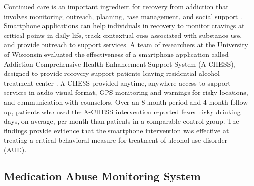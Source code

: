 \documentclass[sigconf]{acmart}
\begin{document}
Continued care is an important ingredient for recovery from addiction that
involves monitoring, outreach, planning, case management, and social support 
\cite{johnson11}. Smartphone applications can help individuals in recovery to 
monitor cravings at critical points in daily life, track contextual cues 
associated with substance use, and provide outreach to support services. A team 
of researchers at the University of Wisconsin evaluated the effectiveness of a
smartphone application called Addiction Comprehensive Health Enhancement Support 
System (A-CHESS), designed to provide recovery support patients leaving 
residential alcohol treatment center \cite{gustafson14}. A-CHESS provided anytime, 
anywhere access to support services in audio-visual format, GPS monitoring and 
warnings for risky locations, and communication with counselors. Over an 8-month
period and 4 month follow-up, patients who used the A-CHESS intervention reported
fewer risky drinking days, on average, per month than patients in a comparable
control group. The findings provide evidence that the smartphone intervention was 
effective at treating a critical behavioral measure for treatment of alcohol use 
disorder (AUD). 

\subsection{Medication Abuse Monitoring System \cite{Varshney14}}
\end{document}
